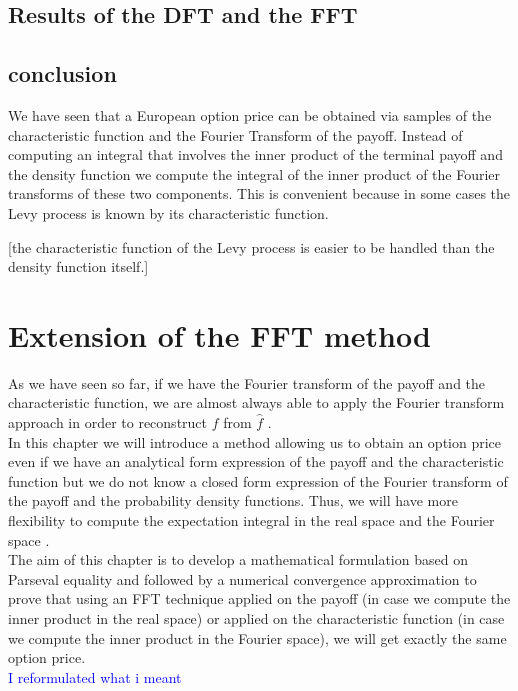 \documentclass[12pt]{report}
\begin{document}
\section{Results of the DFT and the FFT}
\section{conclusion }
We have seen that a European option price can be obtained via samples of the characteristic function and the Fourier Transform of the payoff. Instead of computing an integral that involves the inner product of the terminal payoff and the density function we compute the integral of the inner product of the  Fourier transforms of these two components. This is convenient because in some cases the Levy process is known by its characteristic function.

[the characteristic function  of the Levy process is easier to be handled than the density function itself.]\\
\chapter{Extension of the FFT method }

As we have seen so far, if we have the Fourier transform of the payoff and the characteristic function, we are almost always able to apply the Fourier transform approach in order to reconstruct $f$ from $\hat f$ .\\


In this chapter we will introduce a method allowing us to obtain an option price even if we have an analytical form expression of the payoff and the characteristic function but we do not know a closed form expression of the Fourier transform of the payoff and the probability density functions. Thus, we will have more flexibility to compute the expectation integral in the real space and the Fourier space .\\ 

The aim of this chapter is to develop a mathematical formulation based on Parseval equality  and followed by a numerical convergence approximation to prove that using an FFT technique applied on the payoff (in case we compute the inner product in the real space) or applied on the characteristic function (in case we compute the inner product in the Fourier space), we will get exactly the same option price.\\
\textcolor{blue}{ I reformulated what i meant } \\
\end{document}
